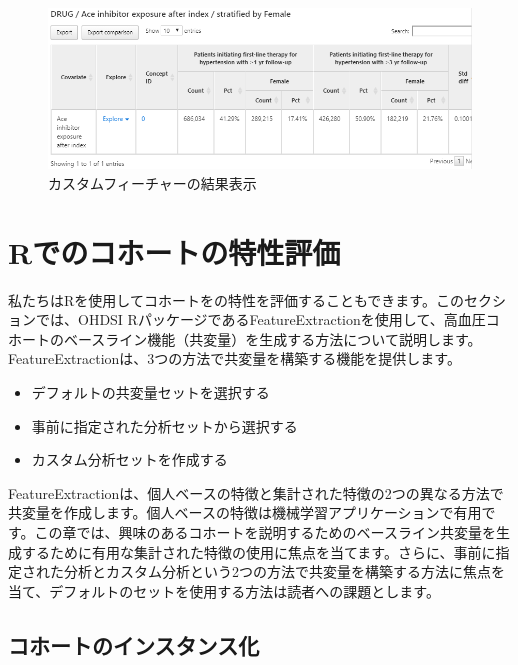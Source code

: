 \documentclass[
  11pt]{book}
\providecommand{\tightlist}{%
  \setlength{\itemsep}{0pt}\setlength{\parskip}{0pt}}
\theoremstyle{definition}
\theoremstyle{definition}
\theoremstyle{definition}
\theoremstyle{definition}
\theoremstyle{remark}
\begin{document}
\begin{figure}

{\centering \includegraphics[width=1\linewidth]{images/Characterization/atlasCharacterizationCustomFeatureResults} 

}

\caption{カスタムフィーチャーの結果表示}\label{fig:atlasCharacterizationCustomFeatureResults}
\end{figure}

\section{Rでのコホートの特性評価}\label{rux3067ux306eux30b3ux30dbux30fcux30c8ux306eux7279ux6027ux8a55ux4fa1}

私たちはRを使用してコホートをの特性を評価することもできます。このセクションでは、OHDSI RパッケージであるFeatureExtractionを使用して、高血圧コホートのベースライン機能（共変量）を生成する方法について説明します。FeatureExtractionは、3つの方法で共変量を構築する機能を提供します。 

\begin{itemize}
\tightlist
\item
  デフォルトの共変量セットを選択する
\item
  事前に指定された分析セットから選択する
\item
  カスタム分析セットを作成する
\end{itemize}

FeatureExtractionは、個人ベースの特徴と集計された特徴の2つの異なる方法で共変量を作成します。個人ベースの特徴は機械学習アプリケーションで有用です。この章では、興味のあるコホートを説明するためのベースライン共変量を生成するために有用な集計された特徴の使用に焦点を当てます。さらに、事前に指定された分析とカスタム分析という2つの方法で共変量を構築する方法に焦点を当て、デフォルトのセットを使用する方法は読者への課題とします。

\subsection{コホートのインスタンス化}\label{ux30b3ux30dbux30fcux30c8ux306eux30a4ux30f3ux30b9ux30bfux30f3ux30b9ux5316}
\end{document}
